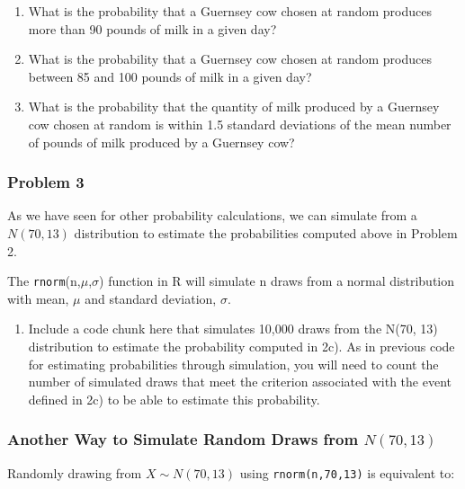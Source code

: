 \documentclass[]{article}
\providecommand{\tightlist}{%
  \setlength{\itemsep}{0pt}\setlength{\parskip}{0pt}}
\begin{document}
\begin{enumerate}
\def\labelenumi{\alph{enumi})}
\item
  What is the probability that a Guernsey cow chosen at random produces
  more than 90 pounds of milk in a given day?
\item
  What is the probability that a Guernsey cow chosen at random produces
  between 85 and 100 pounds of milk in a given day?
\item
  What is the probability that the quantity of milk produced by a
  Guernsey cow chosen at random is within 1.5 standard deviations of the
  mean number of pounds of milk produced by a Guernsey cow?
\end{enumerate}

\hypertarget{problem-3}{%
\subsubsection{Problem 3}\label{problem-3}}

As we have seen for other probability calculations, we can simulate from
a \(N(70, 13)\) distribution to estimate the probabilities computed
above in Problem 2.

The \texttt{rnorm}(n,\(\mu\),\(\sigma\)) function in R will simulate n
draws from a normal distribution with mean, \(\mu\) and standard
deviation, \(\sigma\).

\begin{enumerate}
\def\labelenumi{\roman{enumi})}
\tightlist
\item
  Include a code chunk here that simulates 10,000 draws from the N(70,
  13) distribution to estimate the probability computed in 2c). As in
  previous code for estimating probabilities through simulation, you
  will need to count the number of simulated draws that meet the
  criterion associated with the event defined in 2c) to be able to
  estimate this probability.
\end{enumerate}

\hypertarget{another-way-to-simulate-random-draws-from-n7013}{%
\subsubsection{\texorpdfstring{Another Way to Simulate Random Draws from
\(N(70,13)\)}{Another Way to Simulate Random Draws from N(70,13)}}\label{another-way-to-simulate-random-draws-from-n7013}}

Randomly drawing from \(X \sim N(70, 13)\) using \texttt{rnorm(n,70,13)}
is equivalent to:
\end{document}
